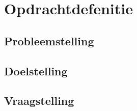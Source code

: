\section{Opdrachtdefenitie}
\subsection{Probleemstelling}
\subsection{Doelstelling}
\subsection{Vraagstelling}